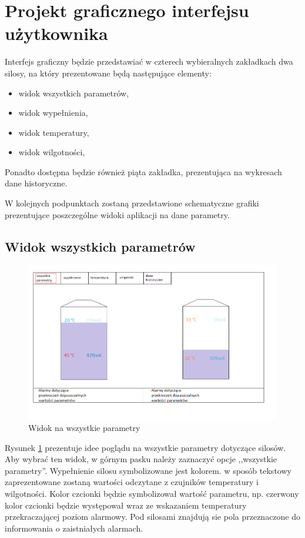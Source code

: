 \section{Projekt graficznego interfejsu użytkownika}
    Interfejs graficzny będzie przedstawiać w czterech wybieralnych zakładkach dwa silosy, na który prezentowane będą następujące elementy:
        \begin{itemize}
            \item widok wszystkich parametrów,
            \item widok wypełnienia,
            \item widok temperatury,
            \item widok wilgotności,
        \end{itemize}
    Ponadto dostępna będzie również piąta zakładka, prezentująca na wykresach dane historyczne.
    
    W kolejnych podpunktach zostaną przedstawione schematyczne grafiki prezentujące poszczególne widoki aplikacji
    na dane parametry.

    \subsection{Widok wszystkich parametrów}
        \begin{figure}[H]
            \centering
            \includegraphics[width = \textwidth]{obrazy/projekt_grafiki/all.png}
            \caption{Widok na wszystkie parametry}
            \label{fig: all}
        \end{figure}
        Rysunek \ref{fig: all} prezentuje idee poglądu na wszystkie parametry dotyczące silosów. Aby wybrać ten widok,
        w górnym pasku należy zaznaczyć opcje ,,wszystkie parametry''. Wypełnienie silosu symbolizowane jest kolorem. 
        w sposób tekstowy zaprezentowane zostaną wartości odczytane z czujników temperatury i wilgotności. Kolor czcionki
        będzie symbolizował wartość parametru, np. czerwony kolor czcionki będzie występował wraz ze wskazaniem temperatury 
        przekraczającej poziom alarmowy. Pod silosami znajdują sie pola przeznaczone do informowania o zaistniałych alarmach.
